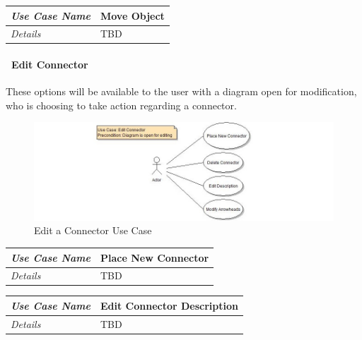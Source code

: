\documentclass[twoside,letterpaper]{article}
\begin{document}
\begin{flushleft}
\tablehead{}
\begin{tabular}{|m{2.0in} m{5.0in}|}
\hline
{\bfseries\emph{Use Case Name}}
& {\bfseries Move Object}
\\\hline
\emph{Details}
& TBD
\\\hline
\end{tabular}
\end{flushleft}
\bigskip

\clearpage

\paragraph[\ Use Category]
{\ Edit Connector} {These options will be available to the user with a diagram open for modification, who is choosing to take action regarding a connector.}

\begin{figure}[h]
\centering
\includegraphics[width=6.0in]{ucaseEditConn.jpg}
\caption{Edit a Connector Use Case}
\end{figure}

\begin{flushleft}
\tablehead{}
\begin{tabular}{|m{2.0in} m{5.0in}|}
\hline {\bfseries\emph{Use Case Name}}
& {\bfseries Place New Connector}
\\\hline
\emph{Details}
& TBD
\\\hline
\end{tabular}
\end{flushleft}
\bigskip
	

\begin{flushleft}
\tablehead{}
\begin{tabular}{|m{2.0in} m{5.0in}|}
\hline {\bfseries\emph{Use Case Name}}
& {\bfseries Edit Connector Description}
\\\hline
\emph{Details}
& TBD
\\\hline
\end{tabular}
\end{flushleft}
\bigskip
\end{document}
